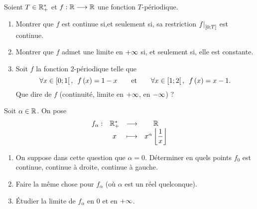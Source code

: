 \begin{corr}
\end{corr}

\begin{exo}[Exercice 3]
Soient \(T\in\mathbb{R}_+^*\) et \(f:\mathbb{R}\longrightarrow\mathbb{R}\) une fonction \(T\)-périodique.

\begin{enumerate}
\item Montrer que \(f\) est continue si,et seulement si, sa restriction \(\restr{f}{\intervii{0}{T}}\) est continue. \\

\item Montrer que \(f\) admet une limite en \(+\infty\) si, et seulement si, elle est constante. \\

\item Soit \(f\) la fonction \(2\)-périodique telle que \[\quantifs{\forall x\in\intervie{0}{1}}f\paren{x}=1-x\qquad\text{et}\qquad\quantifs{\forall x\in\intervie{1}{2}}f\paren{x}=x-1.\] Que dire de \(f\) (continuité, limite en \(+\infty\), en \(-\infty\)) ?
\end{enumerate}
\end{exo}

\begin{corr}
\end{corr}

\begin{exo}[Exercice 4]
Soit \(\alpha\in\mathbb{R}\). On pose \[\begin{array}[t]{cccc}f_\alpha : & \mathbb{R}_+^* & \longrightarrow & \mathbb{R} \\ & x & \longmapsto & x^\alpha\left\lfloor\dfrac{1}{x}\right\rfloor\end{array}\]

\begin{enumerate}
\item On suppose dans cette question que \(\alpha=0\). Déterminer en quels points \(f_0\) est continue, continue à droite, continue à gauche. \\

\item Faire la même chose pour \(f_\alpha\) (où \(\alpha\) est un réel quelconque). \\

\item Étudier la limite de \(f_\alpha\) en \(0\) et en \(+\infty\).
\end{enumerate}
\end{exo}

\begin{corr}
\end{corr}

